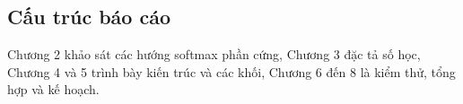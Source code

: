 \subsection{Cấu trúc báo cáo}

Chương 2 khảo sát các hướng softmax phần cứng, Chương 3 đặc tả số học, Chương 4 và 5 trình bày kiến trúc và các khối, Chương 6 đến 8 là kiểm thử, tổng hợp và kế hoạch.
